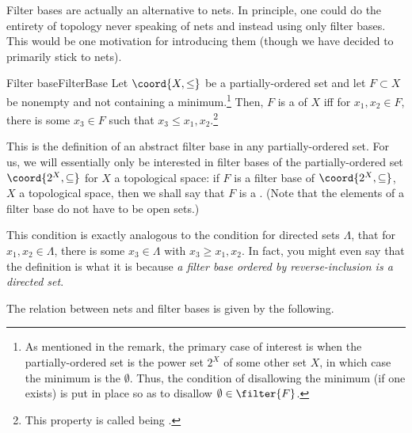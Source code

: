 Filter bases are actually an alternative to nets.  In principle, one could do the entirety of topology never speaking of nets and instead using only filter bases.  This would be one motivation for introducing them (though we have decided to primarily stick to nets).
\begin{dfn}{Filter base}{FilterBase}
Let $\coord{X,\leq}$ be a partially-ordered set and let $F\subset X$ be nonempty and not containing a minimum.\footnote{As mentioned in the remark, the primary case of interest is when the partially-ordered set is the power set $2^X$ of some other set $X$, in which case the minimum is the $\emptyset$.  Thus, the condition of disallowing the minimum (if one exists) is put in place so as to disallow $\emptyset \in \filter{F}$.}  Then, $F$ is a  of $X$ iff for $x_1,x_2\in F$, there is some $x_3\in F$ such that $x_3\leq x_1,x_2$.\footnote{This property is called being .}
\begin{rmk}
This is the definition of an abstract filter base in any partially-ordered set.  For us, we will essentially only be interested in filter bases of the partially-ordered set $\coord{2^X,\subseteq}$ for $X$ a topological space:  if $F$ is a filter base of $\coord{2^X,\subseteq}$, $X$ a topological space, then we shall say that $F$ is a .  (Note that the elements of a filter base do not have to be open sets.)
\end{rmk}
\begin{rmk}
This condition is exactly analogous to the condition for directed sets $\Lambda$, that for $x_1,x_2\in \Lambda$, there is some $x_3\in \Lambda$ with $x_3\geq x_1,x_2$.  In fact, you might even say that the definition is what it is because \emph{a filter base ordered by reverse-inclusion is a directed set}.
\end{rmk}
\end{dfn}
The relation between nets and filter bases is given by the following.
